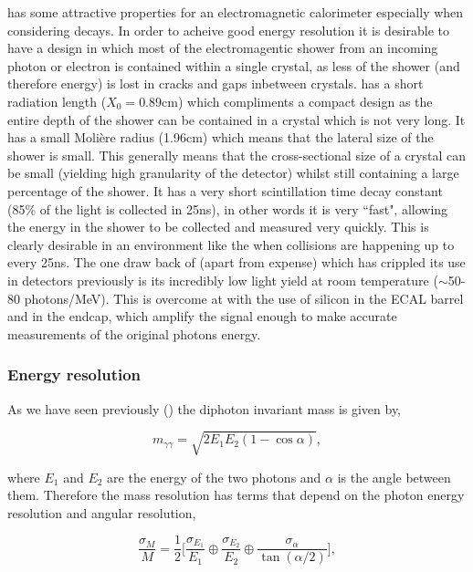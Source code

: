 \PbWO has some attractive properties for an electromagnetic calorimeter especially when considering \Hgg decays. In order to acheive good energy resolution it is desirable to have a design in which most of the electromagentic shower from an incoming photon or electron is contained within a single crystal, as less of the shower (and therefore energy) is lost in cracks and gaps inbetween crystals. \PbWO has a short radiation length ($X_{0}=0.89$cm) which compliments a compact design as the entire depth of the shower can be contained in a crystal which is not very long. It has a small Moli\`{e}re radius (1.96cm) which means that the lateral size of the shower is small. This generally means that the cross-sectional size of a crystal can be small (yielding high granularity of the detector) whilst still containing a large percentage of the shower. It has a very short scintillation time decay constant (85\% of the light is collected in 25ns), in other words it is very ``fast", allowing the energy in the shower to be collected and measured very quickly. This is clearly desirable in an environment like the \LHC when collisions are happening up to every 25ns. The one draw back of \PbWO (apart from expense) which has crippled its use in detectors previously is its incredibly low light yield at room temperature ($\sim$50-80 photons/MeV). This is overcome at \CMS with the use of silicon \APDs in the ECAL barrel and \VPTs in the endcap, which amplify the signal enough to make accurate measurements of the original photons energy. 

\subsubsection{Energy resolution}

As we have seen previously () the diphoton invariant mass is given by,

\begin{equation}
  m_{\gamma\gamma} = \sqrt{2E_{1}E_{2}(1-\cos\alpha)},
  \label{eq:dipho_inv_mass}
\end{equation}

where $E_{1}$ and $E_{2}$ are the energy of the two photons and $\alpha$ is the angle between them. Therefore the mass resolution has terms that depend on the photon energy resolution and angular resolution,

\begin{equation}
  \frac{\sigma_{M}}{M} = \frac{1}{2} \Biggl[ \frac{\sigma_{E_{1}}}{E_{1}} \oplus \frac{\sigma_{E_{2}}}{E_{2}} \oplus \frac{\sigma_{\alpha}}{\tan(\alpha/2)} \Biggr],
  \label{eq:mass_res}
\end{equation}

